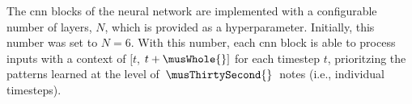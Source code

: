 
The \gls{cnn} blocks of the neural network are implemented
with a configurable number of layers, $N$, which is provided
as a hyperparameter. Initially, this number was set to
$N=6$. With this number, each \gls{cnn} block is able to
process inputs with a context of $[t$, $t + \musWhole{}]$
for each timestep $t$, prioritzing the patterns learned at
the level of $\: \musThirtySecond{} \:$ notes (i.e.,
individual timesteps).

